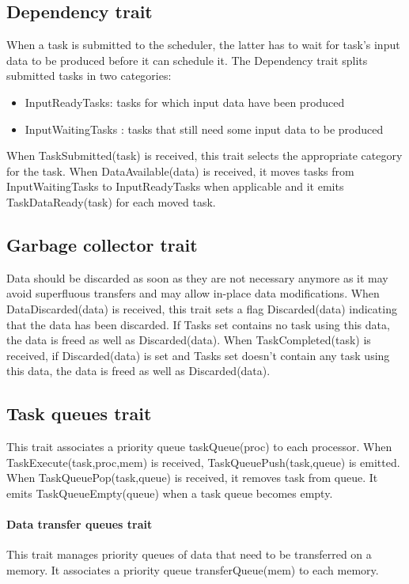 \subsection{Dependency trait}
When a task is submitted to the scheduler, the latter has to wait for task's input data to be produced before it can schedule it.
The Dependency trait splits submitted tasks in two categories:
\begin{itemize}
  \item InputReadyTasks: tasks for which input data have been produced
  \item InputWaitingTasks : tasks that still need some input data to be produced
\end{itemize}

When TaskSubmitted(task) is received, this trait selects the appropriate category for the task.
When DataAvailable(data) is received, it moves tasks from InputWaitingTasks to InputReadyTasks when applicable and it emits TaskDataReady(task) for each moved task.

\subsection{Garbage collector trait}
Data should be discarded as soon as they are not necessary anymore as it may avoid superfluous transfers and may allow in-place data modifications.
When DataDiscarded(data) is received, this trait sets a flag Discarded(data) indicating that the data has been discarded.
If Tasks set contains no task using this data, the data is freed as well as Discarded(data).
When TaskCompleted(task) is received, if Discarded(data) is set and Tasks set doesn't contain any task using this data, the data is freed as well as Discarded(data).


\subsection{Task queues trait}
This trait associates a priority queue taskQueue(proc) to each processor.
When TaskExecute(task,proc,mem) is received, TaskQueuePush(task,queue) is emitted.
When TaskQueuePop(task,queue) is received, it removes task from queue.
It emits TaskQueueEmpty(queue) when a task queue becomes empty.

\paragraph{Data transfer queues trait}
This trait manages priority queues of data that need to be transferred on a memory.
It associates a priority queue transferQueue(mem) to each memory.

